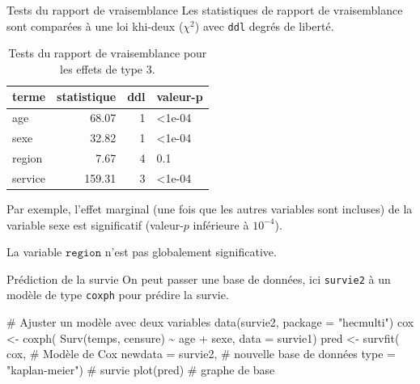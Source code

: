 \documentclass[
  ignorenonframetext,
]{beamer}
\newenvironment{Shaded}{\begin{snugshade}}{\end{snugshade}}
\newcommand{\AttributeTok}[1]{\textcolor[rgb]{0.40,0.45,0.13}{#1}}
\newcommand{\CommentTok}[1]{\textcolor[rgb]{0.37,0.37,0.37}{#1}}
\newcommand{\FunctionTok}[1]{\textcolor[rgb]{0.28,0.35,0.67}{#1}}
\newcommand{\NormalTok}[1]{\textcolor[rgb]{0.00,0.23,0.31}{#1}}
\newcommand{\OtherTok}[1]{\textcolor[rgb]{0.00,0.23,0.31}{#1}}
\newcommand{\SpecialCharTok}[1]{\textcolor[rgb]{0.37,0.37,0.37}{#1}}
\newcommand{\StringTok}[1]{\textcolor[rgb]{0.13,0.47,0.30}{#1}}
\begin{document}
\begin{frame}[fragile]{Tests du rapport de vraisemblance}
\protect\hypertarget{tests-du-rapport-de-vraisemblance}{}
Les statistiques de rapport de vraisemblance sont comparées à une loi
khi-deux (\(\chi^2\)) avec \texttt{ddl} degrés de liberté.

\hypertarget{tbl-survie5-deviance}{}
\begin{table}
\caption{\label{tbl-survie5-deviance}Tests du rapport de vraisemblance pour les effets de type 3. }\tabularnewline

\centering
\begin{tabular}{lrrl}
\toprule
terme & statistique & ddl & valeur-p\\
\midrule
age & 68.07 & 1 & <1e-04\\
sexe & 32.82 & 1 & <1e-04\\
region & 7.67 & 4 & 0.1\\
service & 159.31 & 3 & <1e-04\\
\bottomrule
\end{tabular}
\end{table}

Par exemple, l'effet marginal (une fois que les autres variables sont
incluses) de la variable sexe est significatif (valeur-\(p\) inférieure
à \(10^{-4}\)).

La variable \(\texttt{region}\) n'est pas globalement significative.
\end{frame}

\begin{frame}[fragile]{Prédiction de la survie}
\protect\hypertarget{pruxe9diction-de-la-survie}{}
On peut passer une base de données, ici \texttt{survie2} à un modèle de
type \texttt{coxph} pour prédire la survie.

\begin{Shaded}
\begin{Highlighting}[numbers=left,,]
\CommentTok{\# Ajuster un modèle avec deux variables}
\FunctionTok{data}\NormalTok{(survie2, }\AttributeTok{package =} \StringTok{"hecmulti"}\NormalTok{)}
\NormalTok{cox }\OtherTok{\textless{}{-}} \FunctionTok{coxph}\NormalTok{(}
  \FunctionTok{Surv}\NormalTok{(temps, censure) }\SpecialCharTok{\textasciitilde{}} 
\NormalTok{    age }\SpecialCharTok{+}\NormalTok{ sexe, }
  \AttributeTok{data =}\NormalTok{ survie1)}
\NormalTok{pred }\OtherTok{\textless{}{-}} \FunctionTok{survfit}\NormalTok{(}
\NormalTok{  cox,       }\CommentTok{\# Modèle de Cox}
  \AttributeTok{newdata =}\NormalTok{ survie2, }\CommentTok{\# nouvelle base de données}
  \AttributeTok{type =} \StringTok{"kaplan{-}meier"}\NormalTok{) }\CommentTok{\# survie}
\FunctionTok{plot}\NormalTok{(pred) }\CommentTok{\# graphe de base}
\end{Highlighting}
\end{Shaded}
\end{frame}
\end{document}
